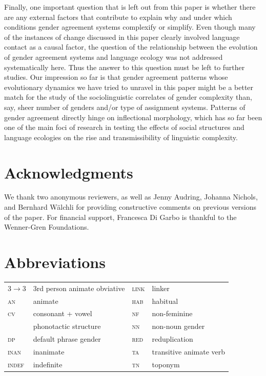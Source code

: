 \documentclass[output=collectionpaper]{langsci/langscibook}
\begin{document}
Finally, one important question that is left out from this paper is whether there are any external factors that contribute to explain why and under which conditions gender agreement systems complexify or simplify. Even though many of the instances of change discussed in this paper clearly involved language contact as a causal factor, the question of the relationship between the evolution of gender agreement systems and language ecology  was not addressed systematically here. Thus the answer to this question must be left to further studies. Our impression so far is that gender agreement patterns \textendash{} whose evolutionary dynamics we have tried to unravel in this paper \textendash{} might be a better match for the study of the sociolinguistic correlates of gender complexity than, say, sheer number of genders and/or type of assignment systems. Patterns of gender agreement directly hinge on inflectional morphology, which has so far been one of the main foci of research in testing the effects of social structures and language ecologies on the rise and transmissibility of linguistic complexity.



\section*{Acknowledgments}
We thank two anonymous reviewers, as well as Jenny Audring, Johanna Nichols, and Bernhard W\"alchli for providing constructive comments on previous versions of the paper. For financial support, Francesca Di Garbo is thankful to the Wenner-Gren Foundations.

\section*{Abbreviations}
\begin{tabular}{llll}
  3$ \rightarrow $3	&	3rd person animate obviative	&  	  \textsc{link}	&	linker	\\
  \textsc{an}	&	animate	& 	 \textsc{hab}	&	habitual	\\
  \textsc{cv} 	&	 consonant + vowel	&	\textsc{nf}	&	non-feminine	\\
	&	 phonotactic structure 	&	\textsc{nn}	&	non-noun gender	\\
  \textsc{dp} 	&	default phrase gender	&	\textsc{red}	&	reduplication	\\
  \textsc{inan}	&	inanimate	&	\textsc{ta}	&	transitive animate verb	\\
  \textsc{indef}	&	indefinite	&	\textsc{tn}	&	toponym	\\
\end{tabular}
\end{document}
